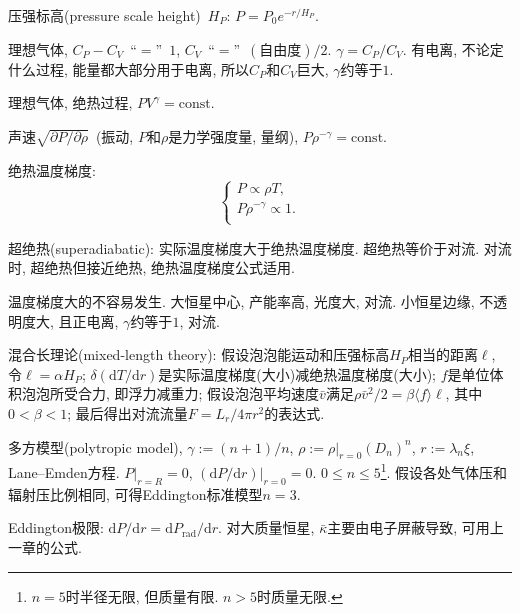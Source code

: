压强标高(pressure scale height)~$H_P$: $P=P_0e^{-r/H_P}$.

理想气体, $C_P-C_V$~``$=$''~$1$, $C_V$~``$=$''~$(\text{自由度})/2$. $\gamma=C_P/C_V$. 有电离, 不论定什么过程, 能量都大部分用于电离, 所以$C_P$和$C_V$巨大, $\gamma$约等于$1$.

理想气体, 绝热过程, $PV^\gamma=\text{const}$.

声速$\sqrt{\partial P/\partial \rho}$~(振动, $P$和$\rho$是力学强度量, 量纲), $P
\rho^{-\gamma}=\text{const}$.

绝热温度梯度:
\begin{equation*}
    \begin{cases}
        P\propto \rho T, \\
        P\rho^{-\gamma} \propto 1. \\
    \end{cases}
\end{equation*}

超绝热(superadiabatic): 实际温度梯度大于绝热温度梯度. 超绝热等价于对流. 对流时, 超绝热但接近绝热, 绝热温度梯度公式适用.

温度梯度大的不容易发生. 大恒星中心, 产能率高, 光度大, 对流. 小恒星边缘, 不透明度大, 且正电离, $\gamma$约等于$1$, 对流.

混合长理论(mixed-length theory): 假设泡泡能运动和压强标高$H_P$相当的距离$\ell$, 令$\ell=\alpha H_P$; $\delta(\mathrm{d}T/\mathrm{d}r)$是实际温度梯度(大小)减绝热温度梯度(大小); $f$是单位体积泡泡所受合力, 即浮力减重力; 假设泡泡平均速度$\bar{v}$满足$\rho\bar{v}^2/2=\beta\langle f\rangle\ell$, 其中$0<\beta<1$; 最后得出对流流量$F=L_r/4\pi r^2$的表达式.

多方模型(polytropic model), $\gamma:=(n+1)/n$, $\rho:=\rho|_{r=0}(D_n)^n$, $r:=\lambda_n\xi$, Lane--Emden方程. $P|_{r=R}=0$, $(\mathrm{d}P/\mathrm{d}r)|_{r=0}=0$. $0\le n \le 5$\footnote{
    $n=5$时半径无限, 但质量有限. $n>5$时质量无限.
}. 假设各处气体压和辐射压比例相同, 可得Eddington标准模型$n=3$.

Eddington极限: $\mathrm{d}P/\mathrm{d}r=\mathrm{d}P_\text{rad}/\mathrm{d}r$. 对大质量恒星, $\bar{\kappa}$主要由电子屏蔽导致, 可用上一章的公式.
